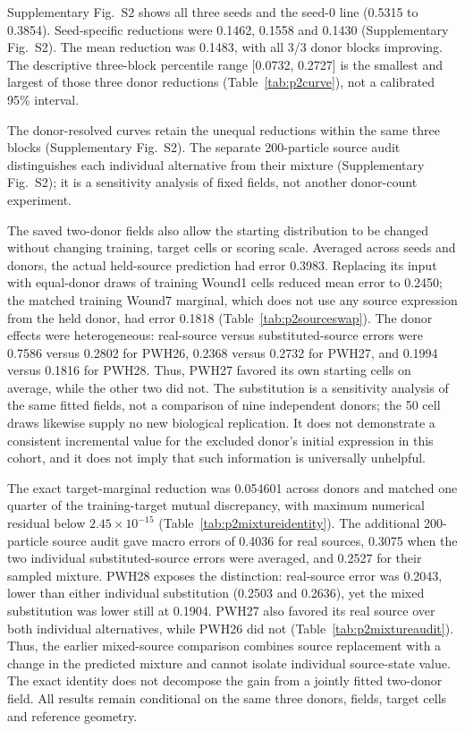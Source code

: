 \documentclass[10pt,a4paper]{article}
\begin{document}
Supplementary Fig.~S2\label{call:p2f6} shows all three seeds and the seed-0 line (0.5315 to 0.3854). Seed-specific reductions were 0.1462, 0.1558 and 0.1430 (Supplementary Fig.~S2). The mean reduction was 0.1483, with all 3/3 donor blocks improving. The descriptive three-block percentile range {[}0.0732, 0.2727{]} is the smallest and largest of those three donor reductions (Table~\ref{tab:p2curve}), not a calibrated 95\% interval.




The donor-resolved curves retain the unequal reductions within the same three blocks (Supplementary Fig.~S2). The separate 200-particle source audit distinguishes each individual alternative from their mixture (Supplementary Fig.~S2); it is a sensitivity analysis of fixed fields, not another donor-count experiment.

The saved two-donor fields also allow the starting distribution to be changed without changing training, target cells or scoring scale. Averaged across seeds and donors, the actual held-source prediction had error 0.3983. Replacing its input with equal-donor draws of training Wound1 cells reduced mean error to 0.2450; the matched training Wound7 marginal, which does not use any source expression from the held donor, had error 0.1818 (Table~\ref{tab:p2sourceswap}). The donor effects were heterogeneous: real-source versus substituted-source errors were 0.7586 versus 0.2802 for PWH26, 0.2368 versus 0.2732 for PWH27, and 0.1994 versus 0.1816 for PWH28. Thus, PWH27 favored its own starting cells on average, while the other two did not. The substitution is a sensitivity analysis of the same fitted fields, not a comparison of nine independent donors; the 50 cell draws likewise supply no new biological replication. It does not demonstrate a consistent incremental value for the excluded donor's initial expression in this cohort, and it does not imply that such information is universally unhelpful.

The exact target-marginal reduction was 0.054601 across donors and matched one quarter of the training-target mutual discrepancy, with maximum numerical residual below $2.45\times10^{-15}$ (Table~\ref{tab:p2mixtureidentity}). The additional 200-particle source audit gave macro errors of 0.4036 for real sources, 0.3075 when the two individual substituted-source errors were averaged, and 0.2527 for their sampled mixture. PWH28 exposes the distinction: real-source error was 0.2043, lower than either individual substitution (0.2503 and 0.2636), yet the mixed substitution was lower still at 0.1904. PWH27 also favored its real source over both individual alternatives, while PWH26 did not (Table~\ref{tab:p2mixtureaudit}). Thus, the earlier mixed-source comparison combines source replacement with a change in the predicted mixture and cannot isolate individual source-state value. The exact identity does not decompose the gain from a jointly fitted two-donor field. All results remain conditional on the same three donors, fields, target cells and reference geometry.
\end{document}
